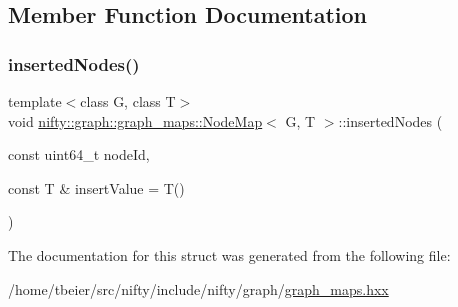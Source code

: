 \subsection{Member Function Documentation}
\mbox{\label{structnifty_1_1graph_1_1graph__maps_1_1NodeMap_a63aea0a762e0ec912e8c9ef357268d09}} 
\subsubsection{\texorpdfstring{inserted\+Nodes()}{insertedNodes()}}
{\footnotesize\ttfamily template$<$class G, class T$>$ \\
void \hyperlink{structnifty_1_1graph_1_1graph__maps_1_1NodeMap}{nifty\+::graph\+::graph\+\_\+maps\+::\+Node\+Map}$<$ G, T $>$\+::inserted\+Nodes (\begin{DoxyParamCaption}\item[{const uint64\+\_\+t}]{node\+Id,  }\item[{const T \&}]{insert\+Value = {\ttfamily T()} }\end{DoxyParamCaption})\hspace{0.3cm}{\ttfamily [inline]}}



The documentation for this struct was generated from the following file\+:\begin{DoxyCompactItemize}
\item 
/home/tbeier/src/nifty/include/nifty/graph/\hyperlink{graph__maps_8hxx}{graph\+\_\+maps.\+hxx}\end{DoxyCompactItemize}

